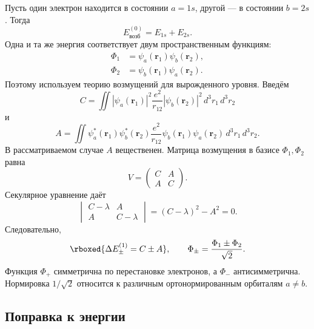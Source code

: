 \documentclass[../final.tex]{subfiles}
\begin{document}
Пусть один электрон находится в состоянии \(a=1s\), другой ---
в состоянии \(b=2s\). Тогда
\begin{equation*}
    E_{\text{возб}}^{(0)}=E_{1s}+E_{2s}.
\end{equation*}
Одна и та же энергия соответствует двум пространственным функциям:
\begin{align*}
    \Phi_1&=\psi_a(\mathbf r_1)\psi_b(\mathbf r_2),\\
    \Phi_2&=\psi_b(\mathbf r_1)\psi_a(\mathbf r_2).
\end{align*}
Поэтому используем теорию возмущений для вырожденного уровня.
Введём 
\begin{equation*}
    C=\iint |\psi_a(\mathbf r_1)|^2
    \frac{e^2}{r_{12}}|\psi_b(\mathbf r_2)|^2
    \,d^3r_1\,d^3r_2
\end{equation*}
и 
\begin{equation*}
    A=\iint \psi_a^{*}(\mathbf r_1)\psi_b^{*}(\mathbf r_2)
    \frac{e^2}{r_{12}}
    \psi_b(\mathbf r_1)\psi_a(\mathbf r_2)
    \,d^3r_1\,d^3r_2.
\end{equation*}
В рассматриваемом случае \(A\) вещественен. Матрица возмущения
в базисе \(\Phi_1,\Phi_2\) равна
\begin{equation*}
    V=\begin{pmatrix}C&A\\A&C\end{pmatrix}.
\end{equation*}
Секулярное уравнение даёт
\begin{equation*}
    \begin{vmatrix}C-\lambda&A\\A&C-\lambda\end{vmatrix}
    =(C-\lambda)^2-A^2=0.
\end{equation*}
Следовательно,
\begin{equation*}
    \rboxed{\Delta E_{\pm}^{(1)}=C\pm A},
    \qquad
    \Phi_\pm=\frac{\Phi_1\pm\Phi_2}{\sqrt2}.
\end{equation*}
Функция \(\Phi_+\) симметрична по перестановке электронов,
а \(\Phi_-\) антисимметрична. Нормировка \(1/\sqrt2\) относится
к различным ортонормированным орбиталям \(a\ne b\).

\subsection{Поправка к энергии}
\end{document}
